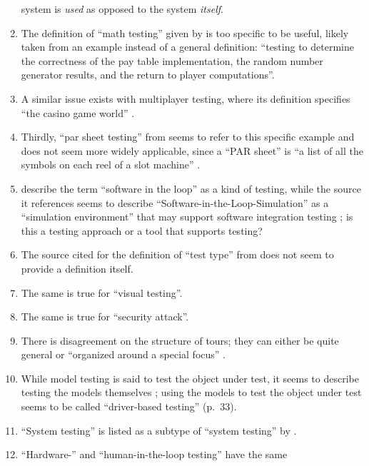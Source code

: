\begin{enumerate}[resume]
            system is \emph{used} as opposed to the system \emph{itself}.
      \item The definition of ``math testing'' given by \citetISTQB{} is
            too specific to be useful, likely taken from an example instead of
            a general definition: ``testing to determine the correctness of the
            pay table implementation, the random number generator results, and
            the return to player computations''.
      \item A similar issue exists with multiplayer testing, where its
            definition specifies ``the casino game world'' \citepISTQB{}.
      \item Thirdly, ``par sheet testing'' from \citepISTQB{} seems to
            refer to this specific example and does not seem more widely
            applicable, since a ``PAR sheet'' is ``a list of all the symbols
            on each reel of a slot machine'' \citep{Bluejay2024}.
      \item \citetISTQB{} describe the term ``software in the loop'' as a
            kind of testing, while the source it references seems to describe
            ``Software-in-the-Loop-Simulation'' as a ``simulation environment''
            that may support software integration testing
            \citep[p.~153]{SPICE2022}; is this a testing approach or a tool
            that supports testing?
      \item The source cited for the definition of ``test type'' from
            \citepISTQB{} does not seem to provide a definition itself.
      \item The same is true for ``visual testing''.
      \item The same is true for ``security attack''.
      \item There is disagreement on the structure of tours; they can either be
            quite general \citep[p.~34]{IEEE2022} or ``organized around a
            special focus'' \citepISTQB{}.
      \item While model testing is said to test the object under test,
            it seems to describe testing the models themselves
            \citet[p.~20]{Firesmith2015}; using the models to test the object
            under test seems to be called ``driver-based testing'' (p.~33).
      \item ``System testing'' is listed as a subtype of ``system testing'' by
            \citet[p.~23]{Firesmith2015}.
      \item ``Hardware-'' and ``human-in-the-loop testing'' have the same

\end{enumerate}
